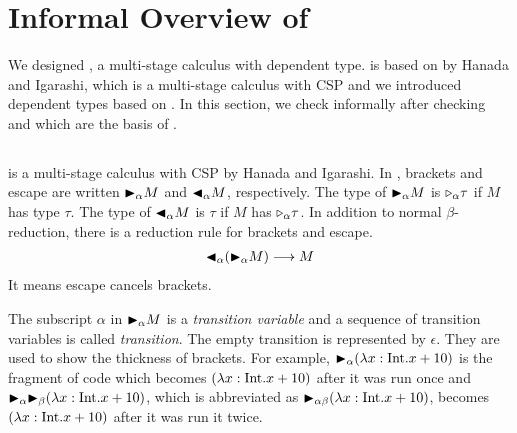 
\section{Informal Overview of \LMD}

We designed \LMD, a multi-stage calculus with dependent type.
\LMD is based on \LTP\cite{Hanada2014} by Hanada and Igarashi, which is a multi-stage calculus with CSP and
we introduced dependent types based on \LTP\cite{attapl}.
In this section, we check \LMD informally after checking \LTP and \LLF which are the basis of \LMD.

\subsection{\LTP}


\LTP\cite{Hanada2014} is a multi-stage calculus with CSP by Hanada and Igarashi.
In \LTP, brackets and escape are written ${\mathop{\blacktriangleright}}_\alpha M$ and ${\mathop{\blacktriangleleft}}_\alpha M$, respectively.
The type of ${\mathop{\blacktriangleright}}_\alpha M$ is ${\mathop{\triangleright}}_\alpha \tau$ if $M$ has type $\tau$.
The type of ${\mathop{\blacktriangleleft}}_\alpha M$ is $\tau$ if $M$ has ${\mathop{\triangleright}}_\alpha \tau$.
In addition to normal $\beta$-reduction, there is a reduction rule for brackets and escape.
\begin{align*}
	{\mathop{\blacktriangleleft}}_\alpha ({\mathop{\blacktriangleright}}_\alpha M) \longrightarrow M 
\end{align*}
It means escape cancels brackets.


The subscript $\alpha$ in ${\mathop{\blacktriangleright}}_\alpha M$ is a \textit{transition variable} and
a sequence of transition variables is called \textit{transition}.
The empty transition is represented by $\epsilon$.
They are used to show the thickness of brackets.
For example, ${\mathop{\blacktriangleright}}_\alpha (\lambda x:\textrm{Int}.x+10)$ is the fragment of code which becomes $(\lambda x:\textrm{Int}.x+10)$ after it was run once and
${\mathop{\blacktriangleright}}_\alpha {\mathop{\blacktriangleright}}_\beta (\lambda x:\textrm{Int}.x+10)$, which is abbreviated as ${\mathop{\blacktriangleright}}_{\alpha\beta} (\lambda x:\textrm{Int}.x+10)$,
becomes $(\lambda x:\textrm{Int}.x+10)$ after it was run it twice.



